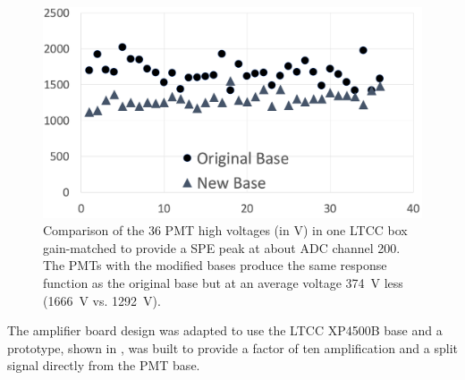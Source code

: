 \begin{figure}
	\centering
	\includegraphics[width=0.99\columnwidth,keepaspectratio]{img/pmtHVImprovement.png}
	\caption{Comparison of the 36 PMT high voltages (in V) in one LTCC box gain-matched to provide a SPE peak at about
          ADC channel 200. The PMTs with the modified bases produce the same response function as the original base but at
          an average voltage 374~V less (1666~V vs. 1292~V).}
	\label{fig:pmtHVImprovement}
\end{figure}

The amplifier board design was adapted to use the LTCC XP4500B base and a prototype, shown in , was
built to provide a factor of ten amplification and a split signal directly from the PMT base.

